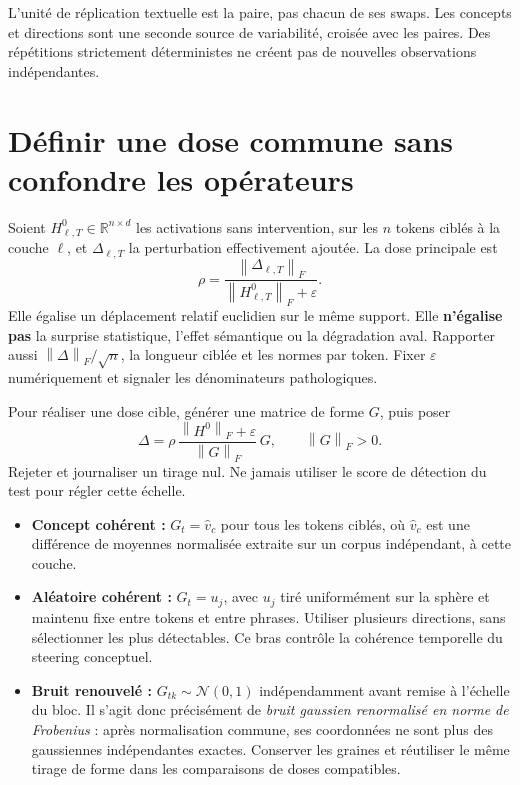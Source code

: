 \documentclass[10pt,a4paper]{article}
\newcommand{\norm}[1]{\left\lVert#1\right\rVert}
\begin{document}
L'unité de réplication textuelle est la paire, pas chacun de ses swaps. Les concepts et directions sont une seconde source de variabilité, croisée avec les paires. Des répétitions strictement déterministes ne créent pas de nouvelles observations indépendantes.

\section{Définir une dose commune sans confondre les opérateurs}
Soient $H^0_{\ell,T}\in\mathbb{R}^{n\times d}$ les activations sans intervention, sur les $n$ tokens ciblés à la couche $\ell$, et $\Delta_{\ell,T}$ la perturbation effectivement ajoutée. La dose principale est
\[
\rho=\frac{\norm{\Delta_{\ell,T}}_F}{\norm{H^0_{\ell,T}}_F+\varepsilon}.
\]
Elle égalise un déplacement relatif euclidien sur le même support. Elle \textbf{n'égalise pas} la surprise statistique, l'effet sémantique ou la dégradation aval. Rapporter aussi $\norm{\Delta}_F/\sqrt n$, la longueur ciblée et les normes par token. Fixer $\varepsilon$ numériquement et signaler les dénominateurs pathologiques.

Pour réaliser une dose cible, générer une matrice de forme $G$, puis poser
\[
\Delta=\rho\,\frac{\norm{H^0}_F+\varepsilon}{\norm{G}_F}\,G,
\qquad \norm{G}_F>0.
\]
Rejeter et journaliser un tirage nul. Ne jamais utiliser le score de détection du test pour régler cette échelle.

\begin{itemize}
\item \textbf{Concept cohérent :} $G_t=\hat v_c$ pour tous les tokens ciblés, où $\hat v_c$ est une différence de moyennes normalisée extraite sur un corpus indépendant, à cette couche.
\item \textbf{Aléatoire cohérent :} $G_t=u_j$, avec $u_j$ tiré uniformément sur la sphère et maintenu fixe entre tokens et entre phrases. Utiliser plusieurs directions, sans sélectionner les plus détectables. Ce bras contrôle la cohérence temporelle du steering conceptuel.
\item \textbf{Bruit renouvelé :} $G_{tk}\sim\mathcal N(0,1)$ indépendamment avant remise à l'échelle du bloc. Il s'agit donc précisément de \emph{bruit gaussien renormalisé en norme de Frobenius} : après normalisation commune, ses coordonnées ne sont plus des gaussiennes indépendantes exactes. Conserver les graines et réutiliser le même tirage de forme dans les comparaisons de doses compatibles.
\end{itemize}
\end{document}
